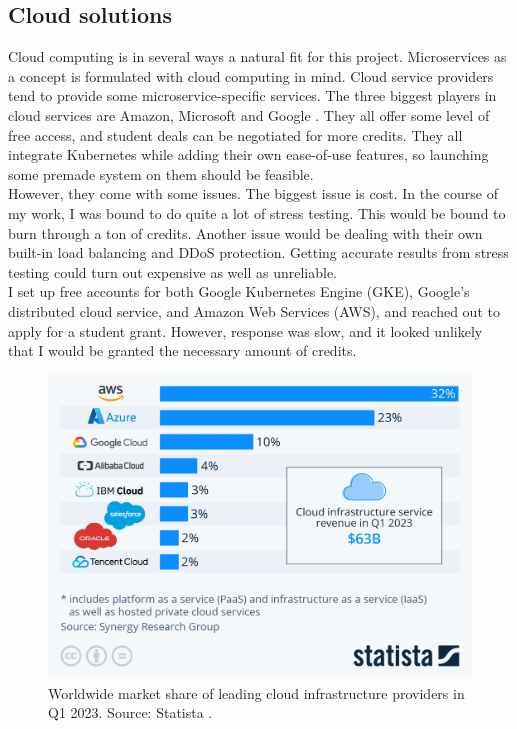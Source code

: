 \subsection{Cloud solutions}
Cloud computing is in several ways a natural fit for this project. Microservices as a concept is formulated with cloud computing in mind. Cloud service providers tend to provide some microservice-specific services. 
The three biggest players in cloud services are Amazon, Microsoft and Google \cite*{DgtlInfra}. They all offer some level of free access, and student deals can be negotiated for more credits. They all integrate Kubernetes while adding their own ease-of-use features, so launching some premade system on them should be feasible. \\
However, they come with some issues. The biggest issue is cost. In the course of my work, I was bound to do quite a lot of stress testing. This would be bound to burn through a ton of credits. Another issue would be dealing with their own built-in load balancing and DDoS protection. Getting accurate results from stress testing could turn out expensive as well as unreliable.\\
I set up free accounts for both Google Kubernetes Engine (GKE), Google's distributed cloud service, and Amazon Web Services (AWS), and reached out to apply for a student grant. However, response was slow, and it looked unlikely that I would be granted the necessary amount of credits.

\begin{figure} 
\centering 
\includegraphics[width=\columnwidth]{Figures/Graphs/Cloud_market_share.jpeg}
\caption{Worldwide market share of leading cloud infrastructure providers in Q1 2023. Source: Statista \cite*{Richter}.}
\label{Cloud market share}
\end{figure}

